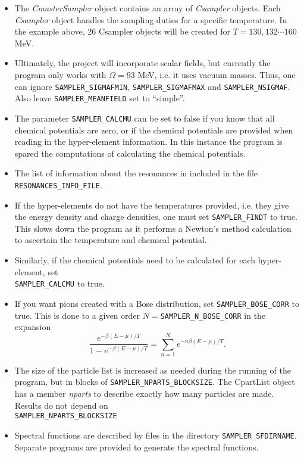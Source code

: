 \begin{itemize}\itemsep=0pt
\item The {\it CmasterSampler} object contains an array of {\it Csampler} objects. Each {\it Csampler} object handles the sampling duties for a specific temperature. In the example above, 26 Csampler objects will be created for $T=130,132\cdots 160$ MeV.
\item Ultimately, the project will incorporate scalar fields, but currently the program only works with $\Omega=93$ MeV, i.e. it uses vacuum masses. Thus, one can ignore {\tt SAMPLER\_SIGMAFMIN}, {\tt SAMPLER\_SIGMAFMAX} and {\tt SAMPLER\_NSIGMAF}. Also leave {\tt SAMPLER\_MEANFIELD} set to ``simple''.
\item The parameter {\tt SAMPLER\_CALCMU} can be set to false if you know that all chemical potentials are zero, or if the chemical potentials are provided when reading in the hyper-element information. In this instance the program is spared the computations of calculating the chemical potentials.
\item The list of information about the resonances in included in the file {\tt RESONANCES\_INFO\_FILE}.
\item If the hyper-elements do not have the temperatures provided, i.e. they give the energy density and charge densities, one must set {\tt SAMPLER\_FINDT} to true. This slows down the program as it performs a Newton's method calculation to ascertain the temperature and chemical potential.
\item Similarly, if the chemical potentials need to be calculated for each hyper-element, set \\{\tt SAMPLER\_CALCMU} to true.
\item If you want pions created with a Bose distribution, set {\tt SAMPLER\_BOSE\_CORR} to true. This is done to a given order $N=${\tt SAMPLER\_N\_BOSE\_CORR} in the expansion
\[
\frac{e^{-\beta(E-\mu)/T}}{1-e^{-\beta(E-\mu)/T}}=\sum_{n=1}^Ne^{-n\beta(E-\mu)/T}.
\]
\item The size of the particle list is increased as needed during the running of the program, but in blocks of {\tt SAMPLER\_NPARTS\_BLOCKSIZE}. The CpartList object has a member {\it nparts} to describe exactly how many particles are made. Results do not depend on\\ {\tt SAMPLER\_NPARTS\_BLOCKSIZE}
\item Spectral functions are described by files in the directory {\tt SAMPLER\_SFDIRNAME}. Separate programs are provided to generate the spectral functions.

\end{itemize}
